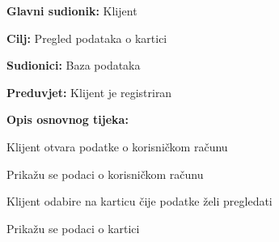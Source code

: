 \noindent {}
\begin{packed_item}
	
	\item \textbf{Glavni sudionik:} Klijent
	\item  \textbf{Cilj:} Pregled podataka o kartici
	\item  \textbf{Sudionici:} Baza podataka
	\item  \textbf{Preduvjet:} Klijent je registriran
	\item  \textbf{Opis osnovnog tijeka:}
	
	\item[] \begin{packed_enum}
		
		\item Klijent otvara podatke o korisničkom računu
		\item Prikažu se podaci o korisničkom računu
		\item Klijent odabire na karticu čije podatke želi pregledati
		\item Prikažu se podaci o kartici
		
	\end{packed_enum}
\end{packed_item}

